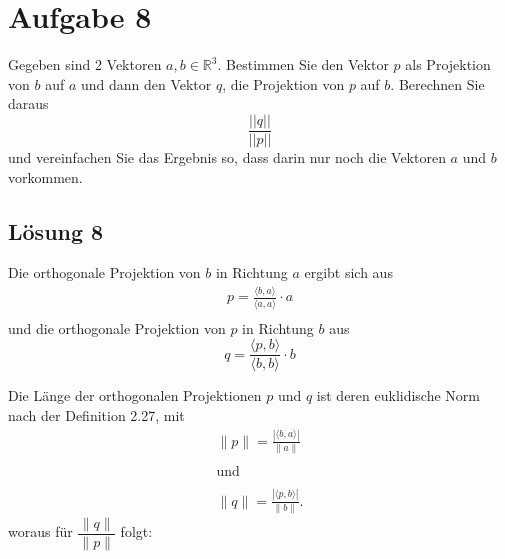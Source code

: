 \section*{Aufgabe 8}

Gegeben sind 2 Vektoren $\displaystyle a,b\in \mathbb{R}^{3}$. Bestimmen Sie den Vektor $\displaystyle p$ als Projektion von $\displaystyle b$ auf $\displaystyle a$ und dann den Vektor $\displaystyle q$, die Projektion von $\displaystyle p$ auf $\displaystyle b$. Berechnen Sie daraus
\begin{equation*}
  \frac{| | q| | }{| | p| | }
\end{equation*}
und vereinfachen Sie das Ergebnis so, dass darin nur noch die Vektoren $\displaystyle a$ und $\displaystyle b$ vorkommen.

\subsection*{Lösung 8}

Die orthogonale Projektion von $\displaystyle b$ in Richtung $\displaystyle a$ ergibt sich aus
\begin{gather*}
  p=\frac{\langle b,a\rangle }{\langle a,a\rangle } \cdot a\\
\end{gather*}
und die orthogonale Projektion von $\displaystyle p$ in Richtung $\displaystyle b$ aus
\begin{equation*}
  q=\frac{\langle p,b\rangle }{\langle b,b\rangle } \cdot b
\end{equation*}

Die Länge der orthogonalen Projektionen $p$ und $q$ ist deren euklidische Norm nach der Definition 2.27, mit
\begin{gather*}
  \| p\| =\frac{| \langle b,a\rangle | }{\| a\| }\\
  \\
  \text{und}\\
  \\
  \| q\| =\frac{| \langle p,b\rangle | }{\| b\| }\text{.}
\end{gather*}
woraus für $\displaystyle \dfrac{\| q\| }{\| p\| }$ folgt: 

